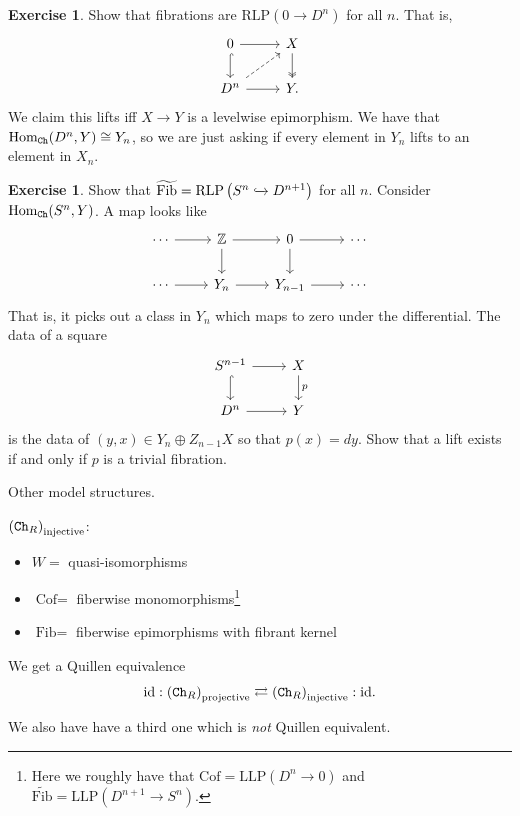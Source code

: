\documentclass[12pt]{amsart}
\let\til\widetilde
\theoremstyle{definition}
\newtheorem{exercise}[theorem]{Exercise}
\providecommand{\Cof}{\text{Cof}}
\providecommand{\Fib}{\text{Fib}}
\providecommand{\LLP}{\text{LLP}}
\providecommand{\RLP}{\text{RLP}}
\begin{document}
\begin{exercise} Show that fibrations are $\RLP(0\to D^n)$ for all $n$. That is,
\[ \begin{tikzcd}
    0\dar[hook]\rar & X\dar[two heads]\\
    D^n\rar\ar[ur,dashed] & Y.
\end{tikzcd} \]
We claim this lifts iff $X \to Y$ is a levelwise epimorphism. We have that $\text{Hom}_{\texttt{Ch}}(D^n,Y) \cong Y_n$, so we are just asking if every element in $Y_n$ lifts to an element in $X_n$.
\end{exercise}

\begin{exercise} Show that $\til{\Fib} = \RLP \left( S^n \hookto D^{n+1} \right)$ for all $n$. Consider $\text{Hom}_{\texttt{Ch}}(S^n,Y)$. A map looks like
\[ \begin{tikzcd}
    \cdots\rar & \Z\rar\dar & 0\rar\dar & \cdots \\
    \cdots\rar & Y_n\rar & Y_{n-1}\rar & \cdots
\end{tikzcd} \]
That is, it picks out a class in $Y_n$ which maps to zero under the differential. The data of a square
\[ \begin{tikzcd}
    S^{n-1}\dar[hook]\rar & X\dar["p" right]\\
    D^n\rar & Y
\end{tikzcd} \]
is the data of $(y,x) \in Y_n \oplus Z_{n-1} X$ so that $p(x) = dy$. Show that a lift exists if and only if $p$ is a trivial fibration.
\end{exercise}

Other model structures.

$\left( \texttt{Ch}_R \right)_\text{injective}$:
\begin{itemize}
    \item $W=$ quasi-isomorphisms
    \item $\Cof=$ fiberwise monomorphisms\footnote{Here we roughly have that $\Cof = \LLP(D^n \to 0)$ and $\til{\Fib} = \LLP(D^{n+1}\to S^n)$.}
    \item $\Fib=$ fiberwise epimorphisms with fibrant kernel
\end{itemize}

We get a Quillen equivalence
\begin{align*}
    \text{id}: \left( \texttt{Ch}_R \right)_\text{projective} \rightleftarrows \left( \texttt{Ch}_R \right)_\text{injective}: \text{id}.
\end{align*}

We also have have a third one which is \textit{not} Quillen equivalent.
\end{document}

